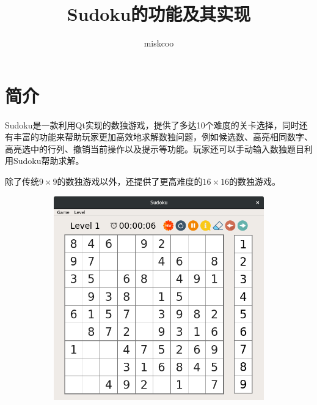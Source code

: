 \documentclass[11pt,a4paper]{article}
\title{Sudoku的功能及其实现}
\author{miskcoo}
\begin{document}
\maketitle
\section{简介}
Sudoku是一款利用Qt实现的数独游戏，提供了多达10个难度的关卡选择，同时还有丰富的功能来帮助玩家更加高效地求解数独问题，例如候选数、高亮相同数字、高亮选中的行列、撤销当前操作以及提示等功能。玩家还可以手动输入数独题目利用Sudoku帮助求解。

除了传统$9 \times 9$的数独游戏以外，还提供了更高难度的$16 \times 16$的数独游戏。

\begin{figure}[H]
	\centering
	\begin{subfigure}{.45\textwidth}
		\centering
		\includegraphics[width=\linewidth]{sudoku-3a.png}
	\end{subfigure}
	\hfill
	\begin{subfigure}{.45\textwidth}
		\centering

\end{subfigure}
\end{figure}
\end{document}
